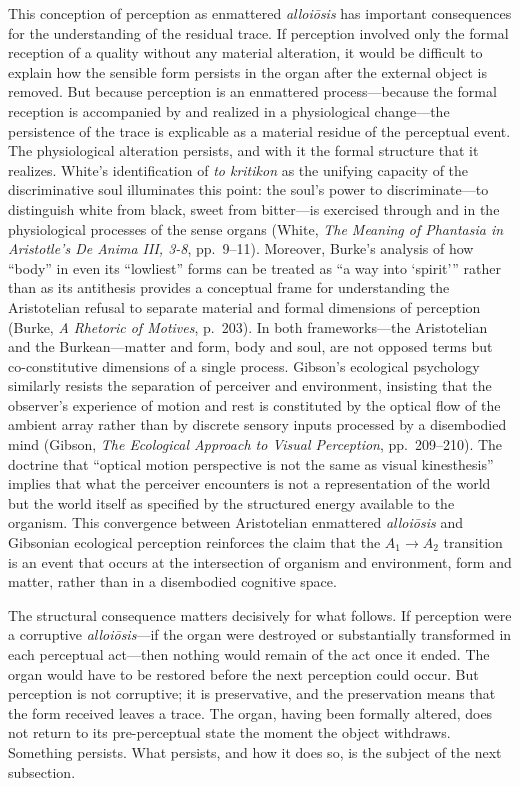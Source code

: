 \documentclass[12pt]{article}
\begin{document}
This conception of perception as enmattered \textit{alloiōsis} has important consequences for the understanding of the residual trace. If perception involved only the formal reception of a quality without any material alteration, it would be difficult to explain how the sensible form persists in the organ after the external object is removed. But because perception is an enmattered process---because the formal reception is accompanied by and realized in a physiological change---the persistence of the trace is explicable as a material residue of the perceptual event. The physiological alteration persists, and with it the formal structure that it realizes. White's identification of \textit{to kritikon} as the unifying capacity of the discriminative soul illuminates this point: the soul's power to discriminate---to distinguish white from black, sweet from bitter---is exercised through and in the physiological processes of the sense organs (White, \textit{The Meaning of Phantasia in Aristotle's De Anima III, 3-8}, pp.~9--11). Moreover, Burke's analysis of how ``body'' in even its ``lowliest'' forms can be treated as ``a way into `spirit''' rather than as its antithesis provides a conceptual frame for understanding the Aristotelian refusal to separate material and formal dimensions of perception (Burke, \textit{A Rhetoric of Motives}, p.~203). In both frameworks---the Aristotelian and the Burkean---matter and form, body and soul, are not opposed terms but co-constitutive dimensions of a single process. Gibson's ecological psychology similarly resists the separation of perceiver and environment, insisting that the observer's experience of motion and rest is constituted by the optical flow of the ambient array rather than by discrete sensory inputs processed by a disembodied mind (Gibson, \textit{The Ecological Approach to Visual Perception}, pp.~209--210). The doctrine that ``optical motion perspective is not the same as visual kinesthesis'' implies that what the perceiver encounters is not a representation of the world but the world itself as specified by the structured energy available to the organism. This convergence between Aristotelian enmattered \textit{alloiōsis} and Gibsonian ecological perception reinforces the claim that the $A_1 \to A_2$ transition is an event that occurs at the intersection of organism and environment, form and matter, rather than in a disembodied cognitive space.

The structural consequence matters decisively for what follows. If perception were a corruptive \textit{alloiōsis}---if the organ were destroyed or substantially transformed in each perceptual act---then nothing would remain of the act once it ended. The organ would have to be restored before the next perception could occur. But perception is not corruptive; it is preservative, and the preservation means that the form received leaves a trace. The organ, having been formally altered, does not return to its pre-perceptual state the moment the object withdraws. Something persists. What persists, and how it does so, is the subject of the next subsection.
\end{document}
